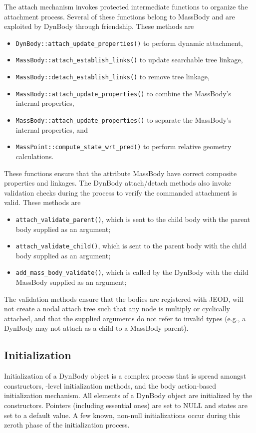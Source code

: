 The attach mechanism invokes protected intermediate functions to organize the
attachment process. Several of these functions belong to MassBody and are
exploited by DynBody through friendship.
These methods are\begin{itemize}
\item \verb+DynBody::attach_update_properties()+ to perform dynamic attachment,
\item \verb+MassBody::attach_establish_links()+ to update searchable tree linkage,
\item \verb+MassBody::detach_establish_links()+ to remove tree linkage,
\item \verb+MassBody::attach_update_properties()+ to combine the MassBody's internal
    properties,
\item \verb+MassBody::attach_update_properties()+ to separate the MassBody's internal
    properties, and
\item \verb+MassPoint::compute_state_wrt_pred()+ to perform relative geometry
    calculations.
\end{itemize}
These functions ensure that the attribute MassBody have correct composite
properties and linkages. The DynBody attach/detach methods also invoke
validation checks during the process to verify the commanded attachment is
valid.
These methods are\begin{itemize}
\item \verb+attach_validate_parent()+,
  which is sent to the child body with the parent body supplied as an argument;
\item \verb+attach_validate_child()+,
  which is sent to the parent body with the child body supplied as an argument;
\item \verb+add_mass_body_validate()+,
  which is called by the DynBody with the child MassBody supplied as an argument;
\end{itemize}
The validation methods ensure that the bodies are registered with JEOD, will
not create a nodal attach tree such that any node is multiply or cyclically
attached, and that the supplied arguments do not refer to invalid types (e.g.,
a DynBody may not attach as a child to a MassBody parent).

\subsection{Initialization}
Initialization of a DynBody object is a complex process that is spread amongst
constructors, \Sdefine-level initialization methods, and the body action-based
initialization mechanism. All elements of a DynBody object are initialized
by the constructors. Pointers (including essential ones) are set to NULL and
states are set to a default value. A few known, non-null initializations occur
during this zeroth phase of the initialization process.

